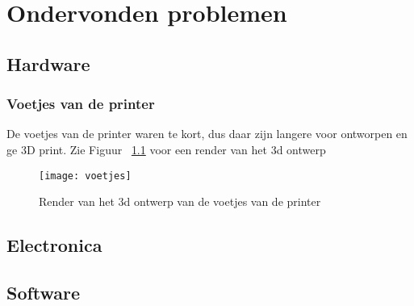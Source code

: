 \chapter{Ondervonden problemen}
\label{Ondervonden_problemen}

\section{Hardware}

\subsection{Voetjes van de printer}

De voetjes van de printer waren te kort, dus daar zijn langere voor
ontworpen en ge 3D print. Zie Figuur ~\ref{fig:voetjes} voor een render van
het 3d ontwerp

\begin{figure}[h]
\centerline{\texttt{[image: voetjes]}}
\caption{Render van het 3d ontwerp van de voetjes van de printer}
\label{fig:voetjes}
\end{figure}

\section{Electronica}
\section{Software}
